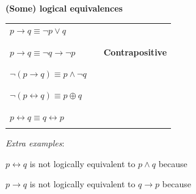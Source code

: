 
{\bf (Some) logical equivalences}

\begin{tabular}{llp{3in}}
$p \to q \equiv \lnot p \lor q$ & & \\
&& \\
&& \\
$p \to q \equiv \lnot q \to \lnot p$ & &{\bf Contrapositive} \\
&& \\
&& \\
$\lnot (p \to q) \equiv p\land \lnot q$  & &\\
&& \\
&& \\
$\lnot( p \leftrightarrow q) \equiv p \oplus q$ && \\
&& \\
&& \\
$p \leftrightarrow q \equiv q \leftrightarrow p$ &&\\
&& \\
\end{tabular}

\vfill

{\it Extra examples}:

$p \leftrightarrow q$ is not logically equivalent to $p \land q$ because \underline{\phantom{\hspace{4in}}} 

$p \to q$ is not logically equivalent to $q \to p$ because \underline{\phantom{\hspace{4in}}} 
\vfill

